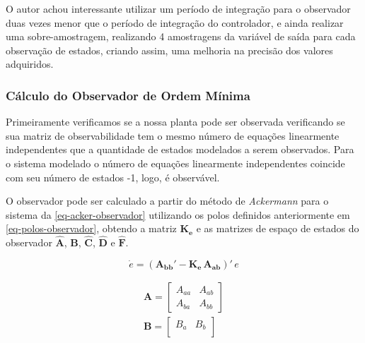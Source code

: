 \documentclass[
	12pt,				%
	article,			%
	openright,			%
	oneside,
	a4paper,			%
	chapter=TITLE,		%
	section=TITLE,		%
	english,			%
	french,				%
	spanish,			%
	brazil,				%
]{abntex2}
\begin{document}
                O autor achou interessante utilizar um período de integração para o observador duas vezes menor que o período de integração do controlador, e ainda realizar uma sobre-amostragem, realizando 4 amostragens da variável de saída para cada observação de estados, criando assim, uma melhoria na precisão dos valores adquiridos.
            
            \subsubsection{Cálculo do Observador de Ordem Mínima}
            
                Primeiramente verificamos se a nossa planta pode ser observada verificando se sua matriz de observabilidade tem o mesmo número de equações linearmente independentes que a quantidade de estados modelados a serem observados. Para o sistema modelado o número de equações linearmente independentes coincide com seu número de estados -1, logo, é observável.
            
                O observador pode ser calculado a partir do método de \textit{Ackermann} para o sistema da \autoref{eq-acker-observador} utilizando os polos definidos anteriormente em \autoref{eq-polos-observador}, obtendo a matriz $\boldsymbol{K_e}$ e as matrizes de espaço de estados do observador $\boldsymbol{\hat{A}}$, $\boldsymbol{\hat{B}}$, $\boldsymbol{\hat{C}}$, $\boldsymbol{\hat{D}}$ e $\boldsymbol{\hat{F}}$.
                
                \begin{equation}
                    \label{eq-acker-observador}
                    \dot{e} = (\boldsymbol{{A_{bb}}'} - \boldsymbol{{K_e}}\,\boldsymbol{{A_{ab}}})'\,e
                \end{equation}
                
                \begin{eqnarray}
                    \nonumber
                    \boldsymbol{A} = 
                    \begin{bmatrix}
                        A_{aa} & A_{ab} \\
                        A_{ba} & A_{bb}
                    \end{bmatrix} \\
                    \nonumber
                    \boldsymbol{B} = 
                    \begin{bmatrix}
                        B_a & B_b \\
                    \end{bmatrix}
                \end{eqnarray}
                
\end{document}

